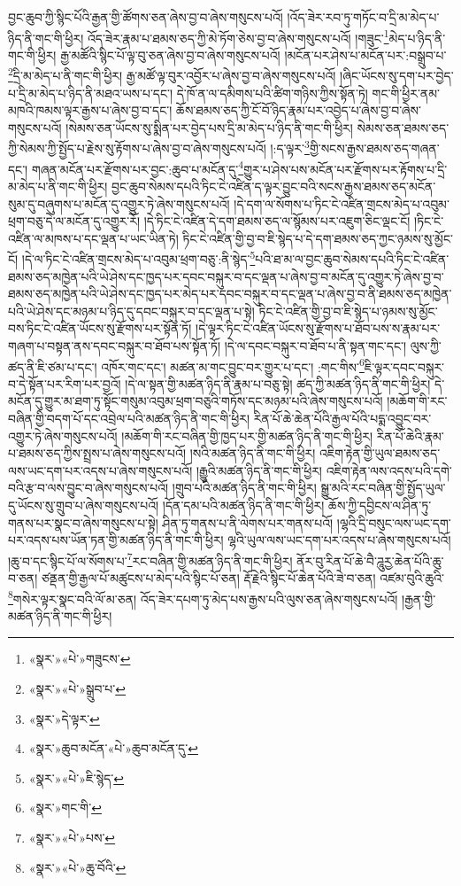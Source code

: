 བྱང་ཆུབ་ཀྱི་སྙིང་པོའི་རྒྱན་གྱི་ཚོགས་ཅན་ཞེས་བྱ་བ་ཞེས་གསུངས་པའོ། །འོད་ཟེར་རབ་ཏུ་གཏོང་བ་དྲི་མ་མེད་པ་ཉིད་ནི་གང་གི་ཕྱིར། འོད་ཟེར་རྣམ་པ་ཐམས་ཅད་ཀྱི་མེ་ཏོག་ཅེས་བྱ་བ་ཞེས་གསུངས་པའོ། །གཟུང་\footnote{«སྣར་»«པེ་»གཟུངས་}མེད་པ་ཉིད་ནི་གང་གི་ཕྱིར། རྒྱ་མཚོའི་སྙིང་པོ་ལྟ་བུ་ཅན་ཞེས་བྱ་བ་ཞེས་གསུངས་པའོ། །མངོན་པར་ཤེས་པ་མངོན་པར་:བསྒྲུབ་པ་\footnote{«སྣར་»«པེ་»སྒྲུབ་པ་}དྲི་མ་མེད་པ་ནི་གང་གི་ཕྱིར། རྒྱ་མཚོ་ལྟ་བུར་འབྱོར་པ་ཞེས་བྱ་བ་ཞེས་གསུངས་པའོ། །ཞིང་ཡོངས་སུ་དག་པར་བྱེད་པ་དྲི་མ་མེད་པ་ཉིད་ནི་མཐའ་ཡས་པ་དང་། དེ་ཁོ་ན་ལ་དམིགས་པའི་ཚིག་གཉིས་ཀྱིས་སྟོན་ཏེ། གང་གི་ཕྱིར་ནམ་མཁའི་ཁམས་ལྟར་རྒྱས་པ་ཞེས་བྱ་བ་དང་། ཆོས་ཐམས་ཅད་ཀྱི་ངོ་བོ་ཉིད་རྣམ་པར་འབྱེད་པ་ཞེས་བྱ་བ་ཞེས་གསུངས་པའོ། །སེམས་ཅན་ཡོངས་སུ་སྨིན་པར་བྱེད་པས་དྲི་མ་མེད་པ་ཉིད་ནི་གང་གི་ཕྱིར། སེམས་ཅན་ཐམས་ཅད་ཀྱི་སེམས་ཀྱི་སྤྱོད་པ་རྗེས་སུ་རྟོགས་པ་ཞེས་བྱ་བ་ཞེས་གསུངས་པའོ། །:ད་ལྟར་\footnote{«སྣར་»དེ་ལྟར་}གྱི་སངས་རྒྱས་ཐམས་ཅད་གཞན་དང་། གཞན་མངོན་པར་རྫོགས་པར་བྱང་:ཆུབ་པ་མངོན་དུ་\footnote{«སྣར་»ཆུབ་མངོན་«པེ་»ཆུབ་མངོན་དུ་}གྱུར་པ་ཤེས་པས་མངོན་པར་རྫོགས་པར་རྟོགས་པ་དྲི་མ་མེད་པ་ནི་གང་གི་ཕྱིར། བྱང་ཆུབ་སེམས་དཔའི་ཏིང་ངེ་འཛིན་ད་ལྟར་བྱུང་བའི་སངས་རྒྱས་ཐམས་ཅད་མངོན་སུམ་དུ་བཞུགས་པ་མངོན་དུ་འགྱུར་ཏེ་ཞེས་གསུངས་པའོ། །དེ་དག་ལ་སོགས་པ་ཏིང་ངེ་འཛིན་གྲངས་མེད་པ་འབུམ་ཕྲག་བཅུ་དེ་ལ་མངོན་དུ་འགྱུར་རོ། །དེ་ཏིང་ངེ་འཛིན་དེ་དག་ཐམས་ཅད་ལ་སྙོམས་པར་འཇུག་ཅིང་ལྡང་ངོ། །ཏིང་ངེ་འཛིན་ལ་མཁས་པ་དང་ལྡན་པ་ཡང་ཡིན་ཏེ། ཏིང་ངེ་འཛིན་གྱི་བྱ་བ་ཇི་སྙེད་པ་དེ་དག་ཐམས་ཅད་ཀྱང་ཉམས་སུ་མྱོང་ངོ། །དེ་ལ་ཏིང་ངེ་འཛིན་གྲངས་མེད་པ་འབུམ་ཕྲག་བཅུ་:ནི་སྙེད་\footnote{«སྣར་»«པེ་»ཇི་སྙེད་}པའི་ཐ་མ་ལ་བྱང་ཆུབ་སེམས་དཔའི་ཏིང་ངེ་འཛིན་ཐམས་ཅད་མཁྱེན་པའི་ཡེ་ཤེས་དང་ཁྱད་པར་དབང་བསྐུར་བ་དང་ལྡན་པ་ཞེས་བྱ་བ་མངོན་དུ་འགྱུར་ཏེ་ཞེས་བྱ་བ་ཐམས་ཅད་མཁྱེན་པའི་ཡེ་ཤེས་དང་ཁྱད་པར་མེད་པར་དབང་བསྐུར་བ་དང་ལྡན་པ་ཞེས་བྱ་བ་ནི་ཐམས་ཅད་མཁྱེན་པའི་ཡེ་ཤེས་དང་མཉམ་པ་ཉིད་དུ་དབང་བསྐུར་བ་དང་ལྡན་པ་སྟེ། ཏིང་ངེ་འཛིན་གྱི་བྱ་བ་ཇི་སྙེད་པ་ཉམས་སུ་མྱོང་བས་ཏིང་ངེ་འཛིན་ཡོངས་སུ་རྫོགས་པར་སྟོན་ཏོ། །དེ་ལྟར་ཏིང་ངེ་འཛིན་ཡོངས་སུ་རྫོགས་པ་ཐོབ་པས་ས་རྣམ་པར་གཞག་པ་བསྟན་ནས་དབང་བསྐུར་བ་ཐོབ་པས་སྟོན་ཏོ། །དེ་ལ་དབང་བསྐུར་བ་ཐོབ་པ་ནི་སྟན་གང་དང་། ལུས་ཀྱི་ཚད་ནི་ཇི་ཙམ་པ་དང་། འཁོར་གང་དང་། མཚན་མ་གང་བྱུང་བར་གྱུར་པ་དང་། :གང་གིས་\footnote{«སྣར་»གང་གི་}ཇི་ལྟར་དབང་བསྐུར་བ་དེ་སྟོན་པར་རིག་པར་བྱའོ། །དེ་ལ་སྟན་གྱི་མཚན་ཉིད་ནི་རྣམ་པ་བཅུ་སྟེ། ཚད་ཀྱི་མཚན་ཉིད་ནི་གང་གི་ཕྱིར། དེ་མངོན་དུ་གྱུར་མ་ཐག་ཏུ་སྟོང་གསུམ་འབུམ་ཕྲག་བཅུའི་གཏོས་དང་མཉམ་པའི་ཞེས་གསུངས་པའོ། །མཆོག་གི་རང་བཞིན་གྱི་བདག་པོ་དང་འབྲེལ་པའི་མཚན་ཉིད་ནི་གང་གི་ཕྱིར། རིན་པོ་ཆེ་ཆེན་པོའི་རྒྱལ་པོའི་པདྨ་འབྱུང་བར་འགྱུར་ཏེ་ཞེས་གསུངས་པའོ། །མཆོག་གི་རང་བཞིན་གྱི་ཁྱད་པར་གྱི་མཚན་ཉིད་ནི་གང་གི་ཕྱིར། རིན་པོ་ཆེའི་རྣམ་པ་ཐམས་ཅད་ཀྱིས་སྤྲས་པ་ཞེས་གསུངས་པའོ། །སའི་མཚན་ཉིད་ནི་གང་གི་ཕྱིར། འཇིག་རྟེན་གྱི་ཡུལ་ཐམས་ཅད་ལས་ཡང་དག་པར་འདས་པ་ཞེས་གསུངས་པའོ། །རྒྱུའི་མཚན་ཉིད་ནི་གང་གི་ཕྱིར། འཇིག་རྟེན་ལས་འདས་པའི་དགེ་བའི་རྩ་བ་ལས་བྱུང་བ་ཞེས་གསུངས་པའོ། །གྲུབ་པའི་མཚན་ཉིད་ནི་གང་གི་ཕྱིར། སྒྱུ་མའི་རང་བཞིན་གྱི་སྤྱོད་ཡུལ་དུ་ཡོངས་སུ་གྲུབ་པ་ཞེས་གསུངས་པའོ། །དོན་དམ་པའི་མཚན་ཉིད་ནི་གང་གི་ཕྱིར། ཆོས་ཀྱི་དབྱིངས་ལ་ཤིན་ཏུ་གནས་པར་སྣང་བ་ཞེས་གསུངས་པ་སྟེ། ཤིན་ཏུ་གནས་པ་ནི་ལེགས་པར་གནས་པའོ། །ལྷའི་དྲི་བསུང་ལས་ཡང་དག་པར་འདས་པས་ཡོན་ཏན་གྱི་མཚན་ཉིད་ནི་གང་གི་ཕྱིར། ལྷའི་ཡུལ་ལས་ཡང་དག་པར་འདས་པ་ཞེས་གསུངས་པའོ། །ཆུ་བ་དང་སྙིང་པོ་ལ་སོགས་པ་\footnote{«སྣར་»«པེ་»པས་}རང་བཞིན་གྱི་མཚན་ཉིད་ནི་གང་གི་ཕྱིར། ནོར་བུ་རིན་པོ་ཆེ་བཻ་ཌཱུརྱ་ཆེན་པོའི་ཆུ་བ་ཅན། ཙནྡན་གྱི་རྒྱལ་པོ་མཚུངས་པ་མེད་པའི་སྙིང་པོ་ཅན། རྡོ་རྗེའི་སྙིང་པོ་ཆེན་པོའི་ཟེ་བ་ཅན། འཛམ་བུའི་ཆུའི་\footnote{«སྣར་»«པེ་»ཆུ་བོའི་}གསེར་ལྟར་སྣང་བའི་ལོ་མ་ཅན། འོད་ཟེར་དཔག་ཏུ་མེད་པས་རྒྱས་པའི་ལུས་ཅན་ཞེས་གསུངས་པའོ། །རྒྱན་གྱི་མཚན་ཉིད་ནི་གང་གི་ཕྱིར། 